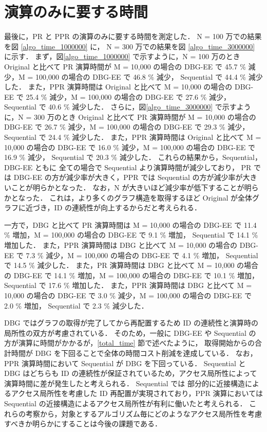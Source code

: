 \section{演算のみに要する時間}
\label{algo_time}
最後に，PR と PPR の演算のみに要する時間を測定した．
N = 100 万での結果を図 \ref{algo_time_1000000} に，
N = 300 万での結果を図 \ref{algo_time_3000000} に示す．
まず，図\ref{algo_time_1000000} で示すように，N = 100 万のとき Original と比べて PR 演算時間が M = 10,000 の場合の DBG-EE で 45.7 \% 減少，M = 100,000 の場合の DBG-EE で 46.8 \% 減少， 
Sequential で 44.4 \% 減少した． 
また，PPR 演算時間は Original と比べて M = 10,000 の場合の DBG-EE で 25.4 \% 減少，M = 100,000 の場合の DBG-EE で 27.6 \% 減少， 
Sequential で 40.6 \% 減少した．
さらに，図\ref{algo_time_3000000} で示すように，N = 300 万のとき Original と比べて PR 演算時間が M = 10,000 の場合の DBG-EE で 26.7 \% 減少，M = 100,000 の場合の DBG-EE で 29.3 \% 減少， 
Sequential で 24.4 \% 減少した．
また，PPR 演算時間は Original と比べて M = 10,000 の場合の DBG-EE で 16.0 \% 減少，M = 100,000 の場合の DBG-EE で 16.9 \% 減少， 
Sequential で 20.3 \% 減少した．
これらの結果から，Sequential，DBG-EE ともに 全ての場合で Sequential より演算時間が減少しており，
PR では DBG-EE の方が減少率が大きく，PPR では Sequential の方が減少率が大きいことが明らかとなった．
なお，N が大きいほど減少率が低下することが明らかとなった．
これは，より多くのグラフ構造を取得するほど Original が全体グラフに近づき，ID の連続性が向上するからだと考えられる．

一方で，DBG と比べて PR 演算時間は M = 10,000 の場合の DBG-EE で 11.4 \% 増加，M = 100,000 の場合の DBG-EE で 9.1 \% 増加， 
Sequential で 14.1 \% 増加した．
また，PPR 演算時間は DBG と比べて M = 10,000 の場合の DBG-EE で 7.3 \% 減少，M = 100,000 の場合の DBG-EE で 4.1 \% 増加， 
Sequential で 14.5 \% 減少した．
また，PR 演算時間は DBG と比べて M = 10,000 の場合の DBG-EE で 14.1 \% 増加，M = 100,000 の場合の DBG-EE で 10.1 \% 増加， 
Sequential で 17.6 \% 増加した．
また，PPR 演算時間は DBG と比べて M = 10,000 の場合の DBG-EE で 3.0 \% 減少，M = 100,000 の場合の DBG-EE で 2.0 \% 増加， 
Sequential で 2.3 \% 減少した．

DBG ではグラフの取得が完了してから再配置するため ID の連続性と演算時の局所性の双方が考慮されている．
そのため，一般に DBG-EE や Sequential の方が演算に時間がかかるが，\ref{total_time} 節で述べたように，
取得開始からの合計時間が DBG を下回ることで全体の時間コスト削減を達成している．
なお，PPR 演算時間において Sequential が DBG を下回っている．
Sequential と DBG はどちらも ID の連続性が保証されているため，アクセス局所性によって演算時間に差が発生したと考えられる．
Sequential では 部分的に近接構造によるアクセス局所性を考慮した ID 再配置が実現されており，PPR 演算においては Sequential の近接構造によるアクセス局所性が有利に働いたと考えられる．
これらの考察から，対象とするアルゴリズム毎にどのようなアクセス局所性を考慮すべきか明らかにすることは今後の課題である．

